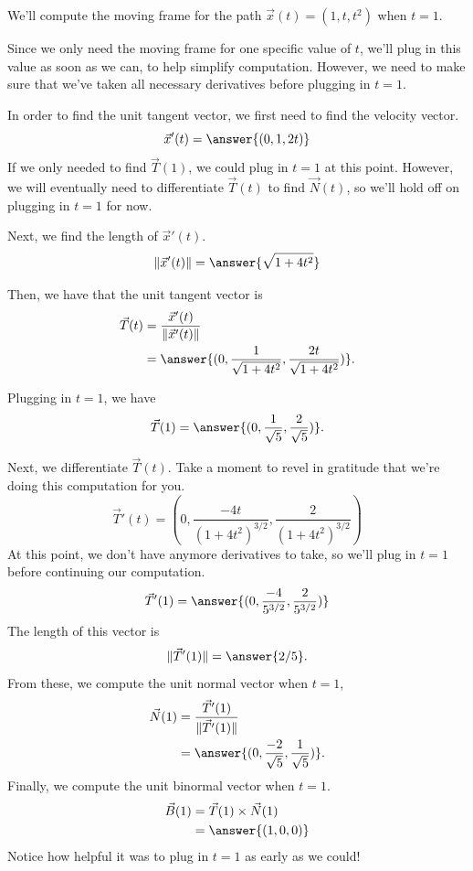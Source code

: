 \documentclass{ximera}
\begin{document}
\begin{example}
We'll compute the moving frame for the path $\vec{x}(t) = (1, t, t^2)$ when $t=1$.

Since we only need the moving frame for one specific value of $t$, we'll plug in this value as soon as we can, to help simplify computation. However, we need to make sure that we've taken all necessary derivatives before plugging in $t=1$.

In order to find the unit tangent vector, we first need to find the velocity vector.
\[
\vec{x}'(t) = \answer{(0, 1, 2t)}
\]
If we only needed to find $\vec{T}(1)$, we could plug in $t=1$ at this point. However, we will eventually need to differentiate $\vec{T}(t)$ to find $\vec{N}(t)$, so we'll hold off on plugging in $t=1$ for now.

Next, we find the length of $\vec{x}'(t)$.
\[
\|\vec{x}'(t)\| = \answer{\sqrt{1+4t^2}}
\]

Then, we have that the unit tangent vector is
\begin{align*}
\vec{T}(t) &= \dfrac{\vec{x}'(t)}{\|\vec{x}'(t)\|}\\
&= \answer{(0,\frac{1}{\sqrt{1+4t^2}}, \frac{2t}{\sqrt{1+4t^2}})}.
\end{align*}

Plugging in $t=1$, we have
\[
\vec{T}(1) = \answer{(0,\frac{1}{\sqrt{5}}, \frac{2}{\sqrt{5}})}.
\]

Next, we differentiate $\vec{T}(t)$. Take a moment to revel in gratitude that we're doing this computation for you.
\[
\vec{T}'(t) = \left(0,\frac{-4t}{(1+4t^2)^{3/2}}, \frac{2}{(1+4t^2)^{3/2}}\right)
\]
At this point, we don't have anymore derivatives to take, so we'll plug in $t=1$ before continuing our computation.
\[
\vec{T}'(1) = \answer{(0,\frac{-4}{5^{3/2}}, \frac{2}{5^{3/2}})}
\]
The length of this vector is
\[
\|\vec{T}'(1)\| = \answer{2/5}.
\]
From these, we compute the unit normal vector when $t=1$,
\begin{align*}
\vec{N}(1) &= \dfrac{\vec{T}'(1)}{\|\vec{T}'(1)\|}\\
&= \answer{(0,\frac{-2}{\sqrt{5}},\frac{1}{\sqrt{5}})}.
\end{align*}
Finally, we compute the unit binormal vector when $t=1$.
\begin{align*}
\vec{B}(1) &= \vec{T}(1)\times\vec{N}(1)\\
&= \answer{(1,0,0)}
\end{align*}
Notice how helpful it was to plug in $t=1$ as early as we could!


\end{example}
\end{document}
